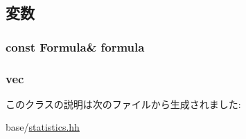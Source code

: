 \subsection{変数}
\hypertarget{classStats_1_1FormulaNode_aec67d3b896ecac7252bcd4160202b641}{
\subsubsection[{formula}]{\setlength{\rightskip}{0pt plus 5cm}const {\bf Formula}\& {\bf formula}}}
\label{classStats_1_1FormulaNode_aec67d3b896ecac7252bcd4160202b641}
\hypertarget{classStats_1_1FormulaNode_a539785a2cf8aa37d52a6023051f9f797}{
\subsubsection[{vec}]{ {\bf vec}}}
\label{classStats_1_1FormulaNode_a539785a2cf8aa37d52a6023051f9f797}


このクラスの説明は次のファイルから生成されました:\begin{DoxyCompactItemize}
\item 
base/\hyperlink{statistics_8hh}{statistics.hh}\end{DoxyCompactItemize}
